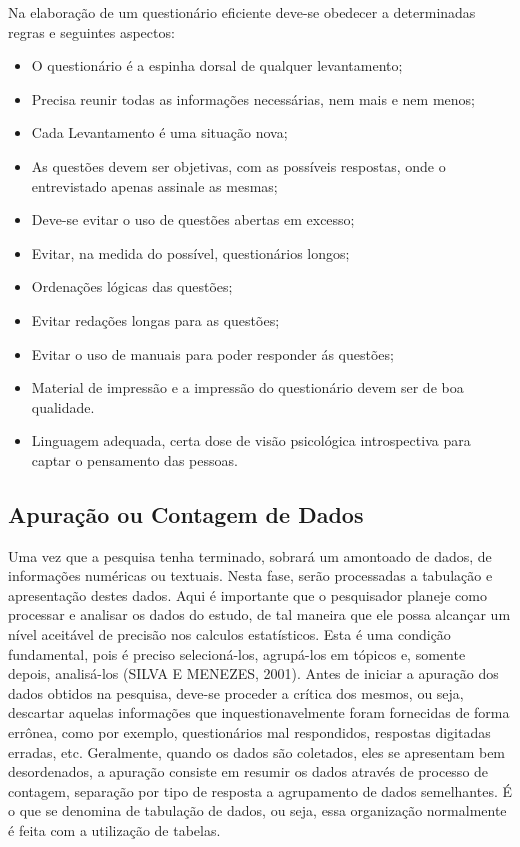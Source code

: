 


Na elaboração de um questionário eficiente deve-se obedecer a determinadas regras e seguintes aspectos:

\begin{itemize}
\item O questionário é a espinha dorsal de qualquer levantamento;
\item Precisa reunir todas as informações necessárias, nem mais e nem menos;
\item Cada Levantamento é uma situação nova;
  \item As questões devem ser objetivas, com as possíveis respostas, onde o entrevistado apenas assinale as mesmas;
  \item Deve-se evitar o uso de questões abertas em excesso;
  \item Evitar, na medida do possível, questionários longos;
  \item Ordenações lógicas das questões;
  \item Evitar redações longas para as questões;
  \item Evitar o uso de manuais para poder responder ás questões;
  \item Material de impressão e a impressão do questionário devem ser de boa qualidade.
  \item Linguagem adequada, certa dose de visão psicológica introspectiva para captar o pensamento das pessoas.
\end{itemize}


\subsection{Apuração ou Contagem de Dados}

Uma vez que a pesquisa tenha terminado, sobrará um amontoado de dados, de informações numéricas ou textuais. Nesta fase, serão
processadas a tabulação e apresentação destes dados. Aqui é
importante que o pesquisador planeje como processar e analisar os
dados do estudo, de tal maneira que ele possa alcançar um nível
aceitável de precisão nos calculos estatísticos. Esta é uma
condição fundamental, pois é preciso selecioná-los, agrupá-los em
tópicos e, somente depois, analisá-los (SILVA E MENEZES, 2001).
Antes de iniciar a apuração dos dados obtidos na pesquisa, deve-se
proceder a crítica dos mesmos, ou seja, descartar aquelas
informações que inquestionavelmente foram fornecidas de forma
errônea, como por exemplo, questionários mal respondidos,
respostas digitadas erradas, etc. Geralmente, quando os dados são
coletados, eles se apresentam bem desordenados, a apuração
consiste em resumir os dados através de processo de contagem,
separação por tipo de resposta a agrupamento de dados semelhantes.
É o que se denomina de tabulação de dados, ou seja, essa
organização normalmente é feita com a utilização de tabelas.\vskip0.3cm

